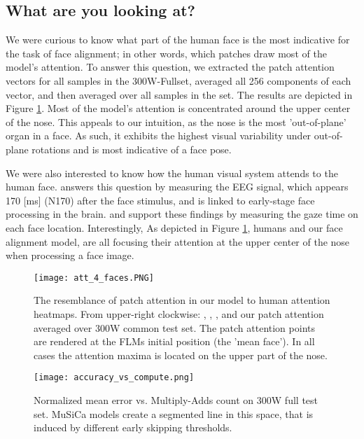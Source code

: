 \documentclass[9pt,twocolumn]{extarticle}
\begin{document}
\subsection{What are you looking at?}
We were curious to know what part of the human face is the most indicative for the task of face alignment; in other words, which patches draw most of the model's attention. To answer this question, we extracted the patch attention vectors for all samples in the 300W-Fullset, averaged all 256 components of each vector, and then averaged over all samples in the set. The results are depicted in Figure \ref{fig:path_attention}. Most of the model's attention is concentrated around the upper center of the nose. This appeals to our intuition, as the nose is the most 'out-of-plane' organ in a face. As such, it exhibits the highest visual variability under out-of-plane rotations and is most indicative of a face pose.

We were also interested to know how the human visual system attends to the human face. \cite{zerouali2013optimal} answers this question by measuring the EEG signal, which appears 170 [ms] (N170) after the face stimulus, and is linked to early-stage face processing in the brain. \cite{bindemann2009viewpoint} and \cite{saether2009anchoring} support these findings by measuring the gaze time on each face location. %
Interestingly, As depicted in Figure \ref{fig:path_attention}, humans and our face alignment model, are all focusing their attention at the upper center of the nose when processing a face image. 

\begin{figure}[H]
\texttt{[image: att\_4\_faces.PNG]}
\caption{The resemblance of patch attention in our model to human attention heatmaps. From upper-right clockwise: \cite{saether2009anchoring}, \cite{bindemann2009viewpoint}, \cite{zerouali2013optimal}, and our patch attention averaged over 300W common test set. The patch attention points are rendered at the FLMs initial position (the 'mean face'). In all cases the attention maxima is located on the upper part of the nose.}
\label{fig:path_attention}
\end{figure}





\begin{figure}[H]
\texttt{[image: accuracy\_vs\_compute.png]}
\caption{Normalized mean error vs. Multiply-Adds count on 300W full test set. MuSiCa models create a segmented line in this space, that is induced by different early skipping thresholds. }
\label{fig:accuracy_vs_compute}
\end{figure}
\end{document}
